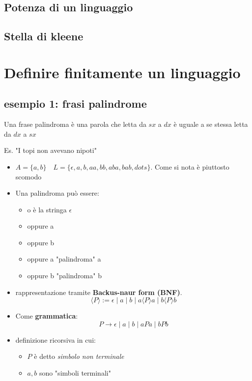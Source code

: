 \subsection{Potenza di un linguaggio}

\subsection{Stella di kleene}

\section{Definire finitamente un linguaggio}
\subsection{esempio 1: frasi palindrome}
Una frase palindroma è una parola che letta da $sx$ a $dx$ è uguale a se stessa letta da $dx$ a $sx$

Es. "I topi non avevano nipoti"
\begin{itemize}
    \item $A=\{a,b\} \quad L=\{\epsilon, a, b, aa, bb, aba, bab, dots\}$. Come si nota è piuttosto scomodo
    \item Una palindroma può essere: 
        \begin{itemize}
            \item o è la stringa $\epsilon$
            \item oppure a
            \item oppure b
            \item oppure a "palindroma" a
            \item oppure b "palindroma" b
        \end{itemize} 
    \item rappresentazione tramite \textbf{Backus-naur form (BNF)}.
    \[
         \langle P \rangle := \epsilon \mid a\mid b\mid a \langle P \rangle a\mid b \langle P \rangle b   
    \]
    \item  Come \textbf{grammatica}:
    \[
        P\to \epsilon \mid a\mid b\mid aPa\mid bPb    
    \]
    \item definizione ricorsiva in cui:
    \begin{itemize}
        \item $P$ è detto \textit{simbolo non terminale}
        \item $a,b$ sono "simboli terminali"
    \end{itemize}
\end{itemize}
